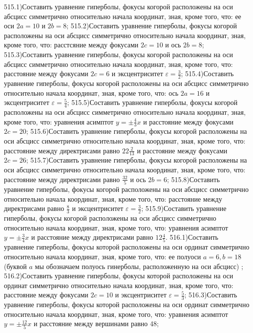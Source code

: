 515.1)Составить уравнение гиперболы, фокусы когорой расположены на оси абсцисс симметрично относительно начала координат, зная, кроме того, что: ее оси $2 a=10$ и $2 b=8$;
515.2)Составить уравнение гиперболы, фокусы когорой расположены на оси абсцисс симметрично относительно начала координат, зная, кроме того, что: расстсяние между фокусами $2 c=10$ и ось $2 b=8$;
515.3)Составить уравнение гиперболы, фокусы когорой расположены на оси абсцисс симметрично относительно начала координат, зная, кроме того, что: расстояние между фокусами $2 c=6$ и эксцентриситет $\varepsilon=\frac{3}{2}$;
515.4)Составить уравнение гиперболы, фокусы когорой расположены на оси абсцисс симметрично относительно начала координат, зная, кроме того, что: ось $2 a=16$ и эксцентриситет $\varepsilon=\frac{5}{4}$;
515.5)Составить уравнение гиперболы, фокусы когорой расположены на оси абсцисс симметрично относительно начала координат, зная, кроме того, что: уравнения асимптот $y= \pm \frac{4}{3} x$ и расстояние между фокусами $2 c=20$;
515.6)Составить уравнение гиперболы, фокусы когорой расположены на оси абсцисс симметрично относительно начала координат, зная, кроме того, что: расстояние между директрисами равно $22 \frac{2}{13}$ и расстояние между фокусами $2 c=26$;
515.7)Составить уравнение гиперболы, фокусы когорой расположены на оси абсцисс симметрично относительно начала координат, зная, кроме того, что: расстояние между директрисами равно $\frac{32}{5}$ и ось $2 b=6$;
515.8)Составить уравнение гиперболы, фокусы когорой расположены на оси абсцисс симметрично относительно начала координат, зная, кроме того, что: расстояние между директрисами равно $\frac{8}{3}$ и эксцентриситет $\varepsilon=\frac{3}{2}$;
515.9)Составить уравнение гиперболы, фокусы когорой расположены на оси абсцисс симметрично относительно начала координат, зная, кроме того, что: уравнения асимптот $y= \pm \frac{3}{4} x$ и расстояние между директрисами равно $12 \frac{4}{5}$.
516.1)Составить уравнение гиперболы, фокусы которой расположены на оси ординат симметрично относительно начала координат, зная, кроме того, что: ее полуоси $a=6, b=18$ (буквой $a$ мы обозначаем полуось гинерболы, расположенную на оси абсцисс) ;
516.2)Составить уравнение гиперболы, фокусы которой расположены на оси ординат симметрично относительно начала координат, зная, кроме того, что: расстояние между фокусами $2 c=10$ и эксцентриситет $\varepsilon=\frac{5}{3}$;
516.3)Составить уравнение гиперболы, фокусы которой расположены на оси ординат симметрично относительно начала координат, зная, кроме того, что: уравнения асимптот $y= \pm \frac{12}{5} x$ и расстояние между вершинами равно 48;
